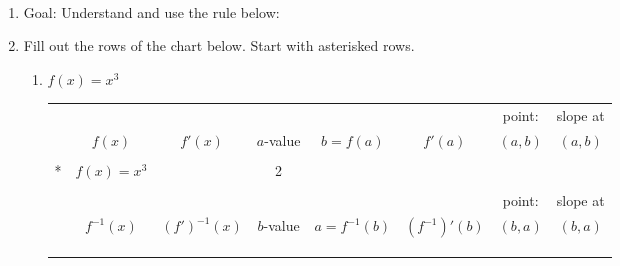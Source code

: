 \documentclass[11pt,fleqn]{article}
\begin{document}
\renewcommand{\headrulewidth}{0pt}
\newcommand{\blank}[1]{\rule{#1}{0.75pt}}
\newcommand{\bc}{\begin{center}}
\newcommand{\ec}{\end{center}}
\renewcommand{\d}{\displaystyle}

\vspace*{-0.7in}

\begin{center}
  \large
  \\
\end{center}
\begin{enumerate}
\item Goal: Understand and use the rule below:\\

\vspace{1in}
\item Fill out the rows of the chart below. Start with asterisked rows.\\
	\begin{enumerate}
	\item $f(x)=x^3$\\
	
	\hspace*{-.5in}\begin{tabular}{c|c|c|c|c|c|c|c}
	&&&&&&point:&slope at\\
	&$f(x)$ &\quad\quad $f'(x)$ \quad\quad& $a$-value& \quad\quad$b=f(a)$ \quad\quad& \quad\quad$f'(a)$ \quad\quad& \quad $(a,b)$&  $(a,b)$\\
	\hline
	&&&&&&\\
	*&$f(x)=x^3$ &  & 2&  &  & & \\
	&&&&&&\\
	\hline
	\hline
	&&&&&&point:&slope at\\
	&$f^{-1}(x)$ & $(f')^{-1}(x)$ & $b$-value& $a=f^{-1}(b)$ & $(f^{-1})'(b)$ & $(b,a)$&  $(b,a)$\\
	\hline&&&&&&\\ &&&&&&\\ &&&&&&\\
	\end{tabular}
	

\end{enumerate}
\end{enumerate}
\end{document}
